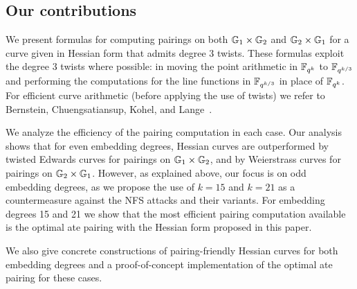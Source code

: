


\subsection{Our contributions}

We present formulas for computing pairings on both $\mathbb{G}_{1} \times \mathbb{G}_{2}$ and $\mathbb{G}_{2} \times \mathbb{G}_{1}$ for a curve given in Hessian form that admits degree 3 twists.
These formulas exploit the degree 3 twists where possible: in moving the point arithmetic in $\mathbb{F}_{q^k}$ to $\mathbb{F}_{q^{k/3}}$ and performing the computations for the line functions in $\mathbb{F}_{q^{k/3}}$ in place of $\mathbb{F}_{q^k}$.
For efficient curve arithmetic (before applying the use of twists) we refer to
Bernstein, Chuengsatiansup, Kohel, and Lange~\cite{2015/hessian}.

We analyze the efficiency of the pairing computation in each case. 
Our analysis shows that for even embedding degrees, Hessian curves are outperformed by twisted Edwards curves for pairings on $\mathbb{G}_{1} \times \mathbb{G}_{2}$, and by Weierstrass curves for pairings on $\mathbb{G}_{2} \times \mathbb{G}_{1}$.
However, as explained above, our focus is on odd embedding degrees, as we propose 
the use of $k=15$ and $k=21$ as a countermeasure against the NFS attacks and their variants.
For embedding degrees 15 and 21 we show that the most efficient pairing
computation available is the optimal ate pairing with the Hessian form proposed in this paper.

We also give concrete constructions of pairing-friendly Hessian curves for both embedding degrees and a proof-of-concept implementation of the optimal ate pairing for these cases. 

